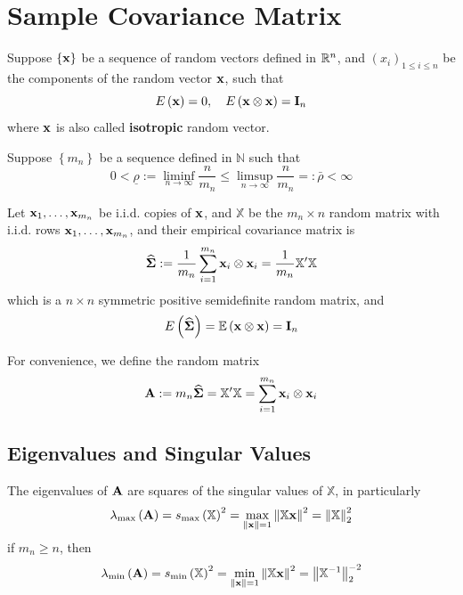 \chapter{Sample Covariance Matrix}

Suppose $\left\{{\bf x}\right\}$ be a sequence of random vectors defined in ${\mathbb R}^{n}$, and $\left(x_{i}\right)_{1\leq i\leq n}$ be the components of the random vector ${\bf x}$, such that
\begin{equation*}
	E\left({\bf x}\right)=0,\quad E\left({\bf x}\otimes{\bf x}\right)=\mathbf{I}_{n}
\end{equation*}
where ${\bf x}$ is also called \textbf{isotropic} random vector.

Suppose $\left\{m_{n}\right\}$ be a sequence defined in $\mathbb{N}$ such that
\begin{equation*}
	0<\underline{\rho}:=\liminf_{n\rightarrow\infty}\frac{n}{m_{n}}\leq\limsup_{n\rightarrow\infty}\frac{n}{m_{n}}=:\bar{\rho}<\infty
\end{equation*}

Let ${\bf x}_{1},\ldots,{\bf x}_{m_{n}}$ be i.i.d. copies of ${\bf x}$, and $\mathbb{X}$ be the $m_{n}\times n$ random matrix with i.i.d. rows ${\bf x}_{1},\ldots,{\bf x}_{m_{n}}$, and their empirical covariance matrix is
\begin{equation*}
	\widehat{\boldsymbol{\Sigma}}:=\frac{1}{m_{n}}\sum_{i=1}^{m_{n}}{\bf x}_{i}\otimes{\bf x}_{i}=\frac{1}{m_{n}}\mathbb{X}^{\prime}\mathbb{X}
\end{equation*}
which is a $n\times n$ symmetric positive semidefinite random matrix, and
\begin{equation*}
	E\left(\widehat{\boldsymbol{\Sigma}}\right)={\mathbb E}\left({\bf x}\otimes{\bf x}\right)=\mathbf{I}_{n}
\end{equation*}

For convenience, we define the random matrix
\begin{equation*}
	{\bf A}:=m_{n}\widehat{\boldsymbol{\Sigma}}=\mathbb{X}^{\prime}\mathbb{X}=\sum_{i=1}^{m_{n}}{\bf x}_{i}\otimes{\bf x}_{i}
\end{equation*}

\section{Eigenvalues and Singular Values}

\begin{theorem}
	The eigenvalues of ${\bf A}$ are squares of the singular values of $\mathbb{X}$, in particularly
	\begin{equation*}
		\lambda_{\max}\left({\bf A}\right)=s_{\max}\left(\mathbb{X}\right)^{2}=\max_{\|{\bf x}\|=1}\left\|\mathbb{X}{\bf x}\right\|^{2}=\left\|\mathbb{X}\right\|_{2}^{2}
	\end{equation*}
	if $m_{n}\geq n$, then
	\begin{equation*}
		\lambda_{\min}\left({\bf A}\right)=s_{\min}\left(\mathbb{X}\right)^{2}=\min_{\|{\bf x}\|=1}\left\|\mathbb{X}{\bf x}\right\|^{2}=\left\|\mathbb{X}^{-1}\right\|_{2}^{-2}
	\end{equation*}
\end{theorem}

